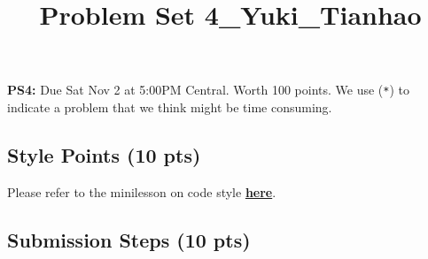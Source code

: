 \documentclass[
  letterpaper,
  DIV=11,
  numbers=noendperiod]{scrartcl}
\title{Problem Set 4\_Yuki\_Tianhao}
\author{}
\date{}
\begin{document}
\maketitle



\textbf{PS4:} Due Sat Nov 2 at 5:00PM Central. Worth 100 points. We use
(\texttt{*}) to indicate a problem that we think might be time
consuming.

\subsection{Style Points (10 pts)}\label{style-points-10-pts}

Please refer to the minilesson on code style
\textbf{\href{https://uchicago.zoom.us/rec/share/pG_wQ-pHTQrJTmqNn4rcrw5V194M2H2s-2jdy8oVhWHkd_yZt9o162IWurpA-fxU.BIQlSgZLRYctvzp-}{here}}.

\subsection{Submission Steps (10 pts)}\label{submission-steps-10-pts}
\end{document}

